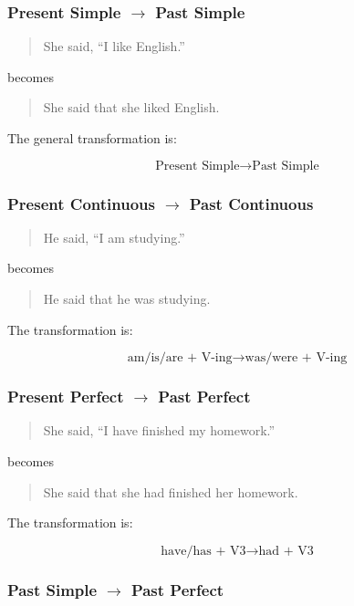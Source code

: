 \subsubsection{Present Simple $\rightarrow$ Past Simple}

\begin{quotation}
She said, ``I like English.''
\end{quotation}

becomes

\begin{quotation}
She said that she liked English.
\end{quotation}

The general transformation is:

\[
\text{Present Simple} \rightarrow \text{Past Simple}
\]


\subsubsection{Present Continuous $\rightarrow$ Past Continuous}

\begin{quotation}
He said, ``I am studying.''
\end{quotation}

becomes

\begin{quotation}
He said that he was studying.
\end{quotation}

The transformation is:

\[
\text{am/is/are + V-ing}
\rightarrow
\text{was/were + V-ing}
\]


\subsubsection{Present Perfect $\rightarrow$ Past Perfect}

\begin{quotation}
She said, ``I have finished my homework.''
\end{quotation}

becomes

\begin{quotation}
She said that she had finished her homework.
\end{quotation}

The transformation is:

\[
\text{have/has + V3}
\rightarrow
\text{had + V3}
\]


\subsubsection{Past Simple $\rightarrow$ Past Perfect}

